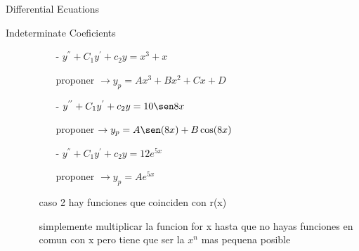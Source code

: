\begin{section}{Differential Ecuations}
\begin{subsection}{Indeterminate Coeficients}
\begin{enumerate}
\begin{enumerate}
						\begin{enumerate}
							\item[-] $y^{''} + C_1y^{'} + c_2y = x^3 + x$
		
								proponer $\rightarrow y_p = Ax^3 + Bx^2 + Cx + D$
							\item[-] $y^{''} + C_1y^{'} + c_2y = 10 \sen 8x$
		
								proponer $\rightarrow y_p = A \sen (8x) + B \cos (8x) $
							\item[-] $y^{''} + C_1y^{'} + c_2y = 12 e^{5x} $
		
								proponer $\rightarrow y_p = Ae^{5x}$
						\end{enumerate}
					\item[caso 2] hay funciones que coinciden con r(x)
		
						simplemente multiplicar la funcion for x hasta que no hayas funciones en comun con x
						pero tiene que ser la $x^n$ mas pequena posible
				\end{enumerate}
		
		\end{enumerate}

	\end{subsection}

\end{section}
	




